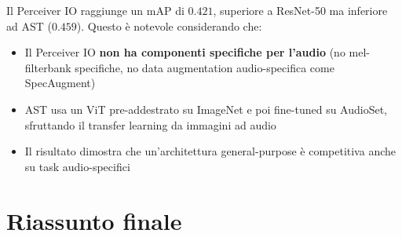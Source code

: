 \documentclass[12pt,a4paper]{article}
\begin{document}
\begin{notabox}
Il Perceiver IO raggiunge un mAP di $0.421$, superiore a ResNet-50 ma inferiore ad AST ($0.459$). Questo \`e notevole considerando che:
\begin{itemize}
    \item Il Perceiver IO \textbf{non ha componenti specifiche per l'audio} (no mel-filterbank specifiche, no data augmentation audio-specifica come SpecAugment)
    \item AST usa un ViT pre-addestrato su ImageNet e poi fine-tuned su AudioSet, sfruttando il transfer learning da immagini ad audio
    \item Il risultato dimostra che un'architettura general-purpose \`e competitiva anche su task audio-specifici
\end{itemize}
\end{notabox}


\section{Riassunto finale}
\end{document}
